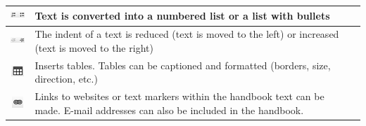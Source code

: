 \begin{tabular}{c | p{14cm} l}
\hline
\includegraphics[height=12pt]{../chapters/09_Qualitaetsmanagement/pictures/Format/Aufzaehlung.jpg} & Text is converted into a numbered list or a list with bullets \\
\hline
\includegraphics[height=12pt]{../chapters/09_Qualitaetsmanagement/pictures/Format/Einruecken.jpg} & The indent of a text is reduced (text is moved to the left) or increased (text is moved to the right) \\
\hline
\includegraphics[height=12pt]{../chapters/09_Qualitaetsmanagement/pictures/Format/Tabellen.jpg} & Inserts tables. Tables can be captioned and formatted (borders, size, direction, etc.) \\
\hline
\includegraphics[height=12pt]{../chapters/09_Qualitaetsmanagement/pictures/Format/Link.jpg} & Links to websites or text markers within the handbook text can be made. E-mail addresses can also be included in the handbook.\\
\hline
\end{tabular}





